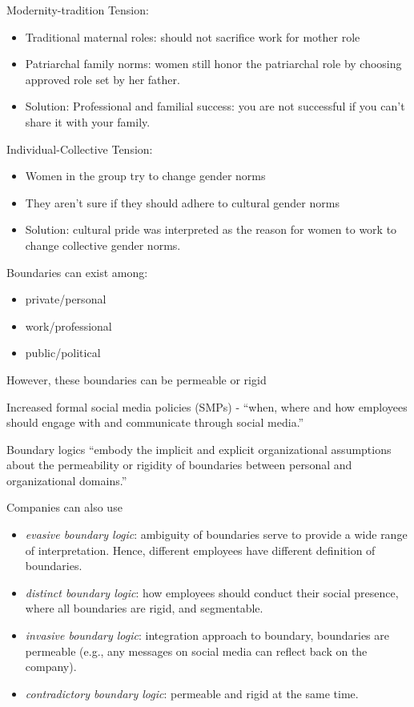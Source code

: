 \documentclass[
]{book}
\providecommand{\tightlist}{%
  \setlength{\itemsep}{0pt}\setlength{\parskip}{0pt}}
\begin{document}
Modernity-tradition Tension:

\begin{itemize}
\tightlist
\item
  Traditional maternal roles: should not sacrifice work for mother role
\item
  Patriarchal family norms: women still honor the patriarchal role by choosing approved role set by her father.
\item
  Solution: Professional and familial success: you are not successful if you can't share it with your family.
\end{itemize}

Individual-Collective Tension:

\begin{itemize}
\tightlist
\item
  Women in the group try to change gender norms
\item
  They aren't sure if they should adhere to cultural gender norms
\item
  Solution: cultural pride was interpreted as the reason for women to work to change collective gender norms.
\end{itemize}

\citep{Banghart_2018}

Boundaries can exist among:

\begin{itemize}
\tightlist
\item
  private/personal
\item
  work/professional
\item
  public/political
\end{itemize}

However, these boundaries can be permeable or rigid

Increased formal social media policies (SMPs) - ``when, where and how employees should engage with and communicate
through social media.'' \citep{Vaast_2013}

Boundary logics ``embody the implicit and explicit organizational assumptions about the permeability or rigidity of
boundaries between personal and organizational domains.''

Companies can also use

\begin{itemize}
\tightlist
\item
  \emph{evasive boundary logic}: ambiguity of boundaries serve to provide a wide range of interpretation. Hence, different
  employees have different definition of boundaries.
\item
  \emph{distinct boundary logic}: how employees should conduct their social presence, where all boundaries are rigid, and
  segmentable.
\item
  \emph{invasive boundary logic}: integration approach to boundary, boundaries are permeable (e.g., any messages on social
  media can reflect back on the company).
\item
  \emph{contradictory boundary logic}: permeable and rigid at the same time.
\end{itemize}
\end{document}
